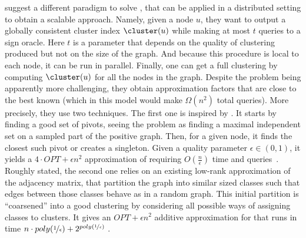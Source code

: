 \begin{aside}
\Textcite{Bonchi2013} suggest a different paradigm to solve \pcc{}, that can be applied in a
distributed setting to obtain a scalable approach. Namely, given a node $u$, they want to output a
globally consistent cluster index $\cluster(u)$ while making at most $t$ queries to a sign oracle.
Here $t$ is a parameter that depends on the quality of clustering produced but not on the size of
the graph. And because this procedure is local to each node, it can be run in parallel. Finally, one
can get a full clustering by computing $\cluster(u)$ for all the nodes in the graph. Despite the
problem being apparently more challenging, they obtain approximation factors that are close to the
best known (which in this model would make $\Omega(n^2)$ total queries). More precisely, they use
two techniques.
The first one is inspired by \ccpivot{}. It starts by finding a good set of pivots, seeing the
problem as finding a maximal independent set on a sampled part of the positive graph. Then, for a
given node, it finds the closest such pivot or creates a singleton. Given a quality parameter
$\epsilon\in(0,1)$, it yields a $4\cdot OPT + \epsilon n^2$ approximation of \mind{} requiring
$O(\frac{n}{\epsilon})$ time and queries~\autocite[Theorem 3.3]{Bonchi2013}.
Roughly stated, the second one relies on an existing low-rank approximation of the adjacency matrix,
that partition the graph into similar sized classes such that edges between those classes behave as
in a random graph. This initial partition is \enquote{coarsened} into a good clustering by
considering all possible ways of assigning classes to clusters. It gives an $OPT + \epsilon n^2$
additive approximation  for \mind{} that runs in time $n \cdot poly(\nicefrac{1}{\epsilon}) +
2^{poly(\nicefrac{1}{\epsilon})}$ \autocite[Corollary 3.7]{Bonchi2013}.
\end{aside}

